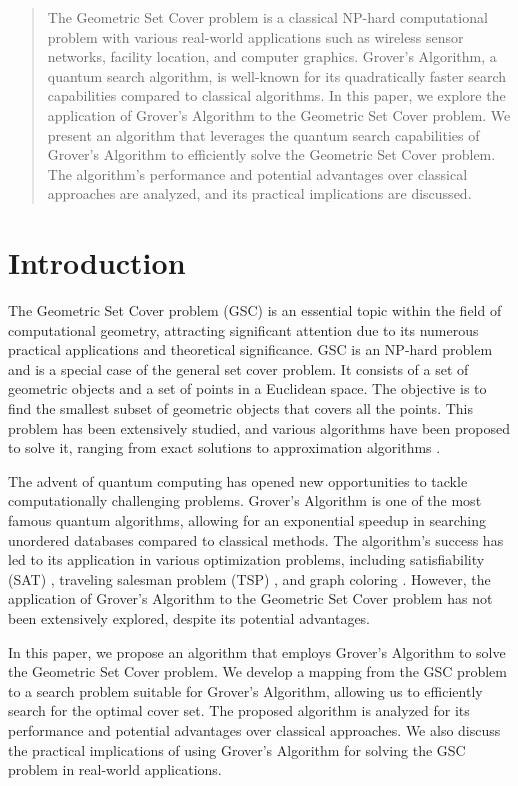 \begin{abstract}
The Geometric Set Cover problem is a classical NP-hard computational problem with various real-world applications such as wireless sensor networks, facility location, and computer graphics. Grover's Algorithm, a quantum search algorithm, is well-known for its quadratically faster search capabilities compared to classical algorithms. In this paper, we explore the application of Grover's Algorithm to the Geometric Set Cover problem. We present an algorithm that leverages the quantum search capabilities of Grover's Algorithm to efficiently solve the Geometric Set Cover problem. The algorithm's performance and potential advantages over classical approaches are analyzed, and its practical implications are discussed.
\end{abstract}

\section{Introduction}

The Geometric Set Cover problem (GSC) is an essential topic within the field of computational geometry, attracting significant attention due to its numerous practical applications and theoretical significance. GSC is an NP-hard problem and is a special case of the general set cover problem. It consists of a set of geometric objects and a set of points in a Euclidean space. The objective is to find the smallest subset of geometric objects that covers all the points. This problem has been extensively studied, and various algorithms have been proposed to solve it, ranging from exact solutions to approximation algorithms \cite{broninmaksimenko2011}.

The advent of quantum computing has opened new opportunities to tackle computationally challenging problems. Grover's Algorithm \cite{grover1996} is one of the most famous quantum algorithms, allowing for an exponential speedup in searching unordered databases compared to classical methods. The algorithm's success has led to its application in various optimization problems, including satisfiability (SAT) \cite{shenvi2003}, traveling salesman problem (TSP) \cite{zalka1999}, and graph coloring \cite{childs2010}. However, the application of Grover's Algorithm to the Geometric Set Cover problem has not been extensively explored, despite its potential advantages.

In this paper, we propose an algorithm that employs Grover's Algorithm to solve the Geometric Set Cover problem. We develop a mapping from the GSC problem to a search problem suitable for Grover's Algorithm, allowing us to efficiently search for the optimal cover set. The proposed algorithm is analyzed for its performance and potential advantages over classical approaches. We also discuss the practical implications of using Grover's Algorithm for solving the GSC problem in real-world applications.

